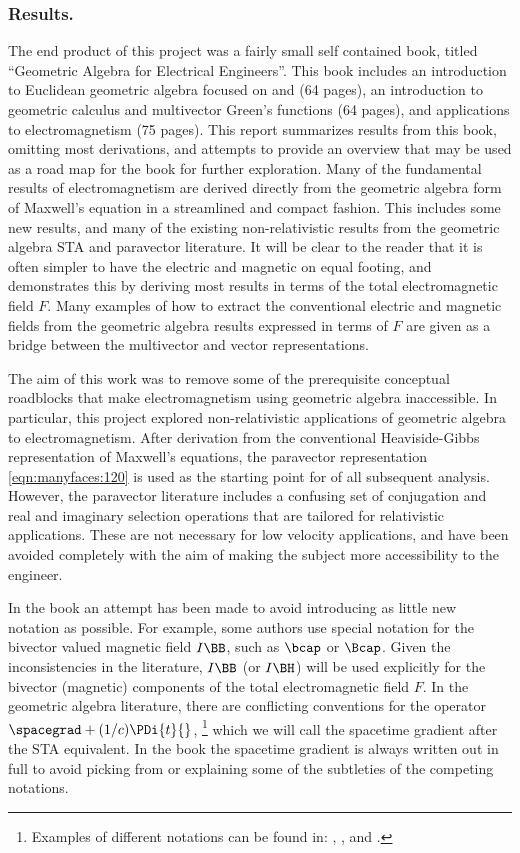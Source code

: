 \subsubsection{Results.}
The end product of this project was a fairly small self contained book, titled ``Geometric Algebra for Electrical Engineers''.
This book includes
an introduction to Euclidean geometric algebra focused on  and  (64 pages), an introduction to geometric calculus and multivector Green's functions (64 pages), and applications to electromagnetism (75 pages).
This report summarizes results from this book, omitting most derivations, and attempts to provide an overview that may be used as a road map for the book for further exploration.
Many of the fundamental results of electromagnetism are derived directly from the geometric algebra form of Maxwell's equation in a streamlined and compact fashion.
This includes some new results, and many of the existing non-relativistic results from the geometric algebra STA and paravector literature.
It will be clear to the reader that it is often simpler to have the electric and magnetic on equal footing, and demonstrates this by deriving most results in terms of the
total electromagnetic field \( F \).
Many examples of how to extract the conventional electric and magnetic fields from the geometric algebra results expressed in terms of \( F \) are given as a bridge between the multivector and vector representations.

The aim of this work was to remove some of the prerequisite conceptual roadblocks that make electromagnetism using geometric algebra inaccessible.
In particular, this project explored non-relativistic applications of geometric algebra to electromagnetism.
After derivation from the conventional Heaviside-Gibbs representation of Maxwell's equations, the
paravector representation
\cref{eqn:manyfaces:120} is used as the starting point for of all subsequent analysis.
However, the paravector literature includes a confusing set of conjugation and real and imaginary selection operations that are tailored for relativistic applications.
These are not necessary for low velocity applications, and have been
avoided completely with the aim of making the subject more accessibility to the engineer.

In the book an attempt has been made to avoid introducing as little new notation as possible.
For example, some authors use special notation for the bivector valued magnetic field \( I \BB \), such as \( \bcap \) or \( \Bcap \).
Given the inconsistencies in the literature, \( I \BB \) (or \( I \BH \)) will be used explicitly for the bivector (magnetic) components of the total electromagnetic field \( F \).
In the geometric algebra literature, there are conflicting conventions for the operator \( \spacegrad + (1/c) \PDi{t}{} \),
\footnote{Examples of different notations can be found in: \citep{jancewicz1988multivectors}, \citep{baylis2004electrodynamics}, and \citep{chappell2014geometric}.}
which we will call the spacetime gradient after the STA equivalent.
In the book the spacetime gradient is always written out in full to avoid picking from or explaining some of the subtleties of the competing notations.

